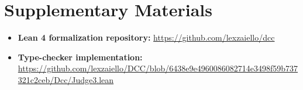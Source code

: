 \documentclass{article}
\begin{document}

\appendix
\section{Supplementary Materials}\label{appendix:sup}

\begin{itemize}
\item \textbf{Lean 4 formalization repository:} \href{https://github.com/lexzaiello/dcc}{https://github.com/lexzaiello/dcc}
  \item \textbf{Type-checker implementation:} \href{https://github.com/lexzaiello/DCC/blob/6438e9e4960086082714e3498f59b737321c2ceb/Dcc/Judge3.lean}{https://github.com/lexzaiello/DCC/blob/6438e9e4960086082714e3498f59b737321c2ceb/Dcc/Judge3.lean}
\end{itemize}
\end{document}
